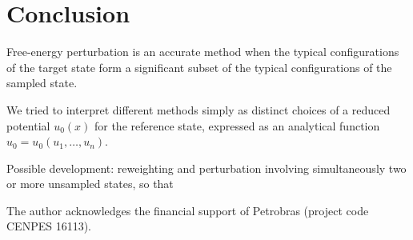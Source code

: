 \documentclass[
    journal=jctcce,
    layout=twocolumn
]{achemso}
\begin{document}
\section{Conclusion}

Free-energy perturbation is an accurate method when the typical configurations of the target state form a significant subset of the typical configurations of the sampled state.

We tried to interpret different methods simply as distinct choices of a reduced potential $u_0(x)$ for the reference state, expressed as an analytical function $u_0 = u_0(u_1,\dots,u_n)$.

Possible development: reweighting and perturbation involving simultaneously two or more unsampled states, so that  

\begin{acknowledgement}

The author acknowledges the financial support of Petrobras (project code CENPES 16113).

\end{acknowledgement}


\end{document}
